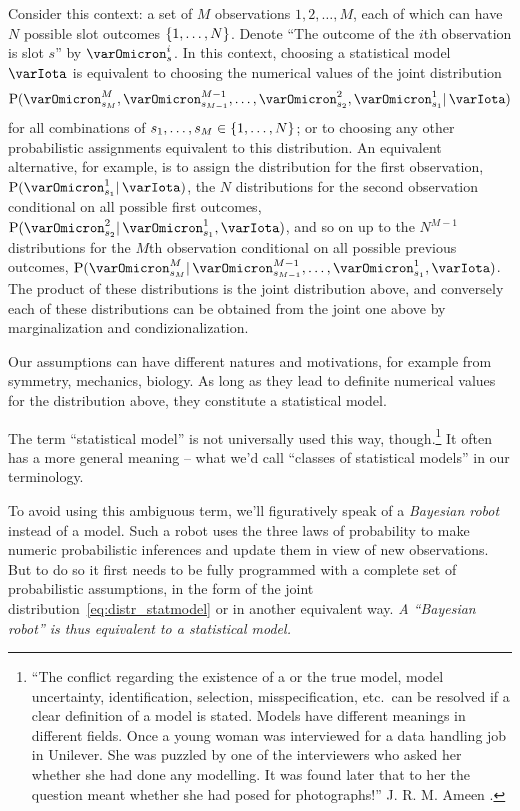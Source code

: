 \documentclass[\ifafour a4paper,12pt,\else a5paper,10pt,\fi%
onecolumn,oneside,article,%
british%
]{memoir}
\theoremstyle{remark}
\theoremstyle{innote}
\newcommand*{\citep}{\parencites}
\DeclarePairedDelimiter\set{\{}{\}}
\newcommand*{\p}{\mathrm{P}}%
\renewcommand*{\|}{\mathpunct{|}}
\newcommand*{\yI}{\varIota}
\begin{document}
Consider this context: a set of $M$ observations $1,2,\dotsc,M$, each of
which can have $N$ possible slot outcomes $\set{1,\dotsc,N}$. Denote
\enquote{The outcome of the $i$th observation is slot $s$} by
$\varOmicron^i_s$. In this context, choosing a statistical model $\yI$ is
equivalent to choosing the numerical values of the joint distribution
\begin{equation}
  \label{eq:distr_statmodel}
  \p( \varOmicron^M_{s_M}, \varOmicron^{M-1}_{s_{M-1}}, \dotsc,  \varOmicron^2_{s_2}, \varOmicron^1_{s_1} \|  \yI)
\end{equation}
for all combinations of $s_1,\dotsc,s_M \in \set{1,\dotsc,N}$; or to
choosing any other probabilistic assignments equivalent to this
distribution. An equivalent alternative, for example, is to assign the
distribution for the first observation, $\p(\varOmicron^1_{s_1} \|\yI)$, the $N$
distributions for the second observation conditional on all possible first
outcomes, $\p(\varOmicron^2_{s_2} \|\varOmicron^1_{s_1}, \yI)$, and so on up to the $N^{M-1}$
distributions for the $M$th observation conditional on all possible
previous outcomes,
$\p(\varOmicron^M_{s_M} \| \varOmicron^{M-1}_{s_{M-1}},\dotsc,\varOmicron^1_{s_1},\yI)$. The product of
these distributions is the joint distribution above, and conversely each of
these distributions can be obtained from the joint one above by
marginalization and condizionalization.

Our assumptions can have different natures and motivations, for example
from symmetry, mechanics, biology. As long as they lead to definite
numerical values for the distribution above, they constitute a statistical
model.

The term \enquote{statistical model} is not universally used this way,
though.\footnote{\enquote{The conflict regarding the existence of a or the
    true model, model uncertainty, identification, selection,
    misspecification, etc.\ can be resolved if a clear definition of a
    model is stated. Models have different meanings in different fields.
    Once a young woman was interviewed for a data handling job in Unilever.
    She was puzzled by one of the interviewers who asked her whether she
    had done any modelling. It was found later that to her the question
    meant whether she had posed for photographs!} J. R. M. Ameen
  \citep[p.~453]{copasetal1995}.} It often has a more general meaning --
what we'd call \enquote{classes of statistical models} in our terminology.

To avoid using this ambiguous term, we'll figuratively speak of a
\emph{Bayesian robot} instead of a model. Such a robot uses the three laws
of probability to make numeric probabilistic inferences and update them in
view of new observations. But to do so it first needs to be fully
programmed with a complete set of probabilistic assumptions, in the form of
the joint distribution~\eqref{eq:distr_statmodel} or in another equivalent
way. \emph{A \enquote{Bayesian robot} is thus equivalent to a statistical
  model.}
\end{document}
